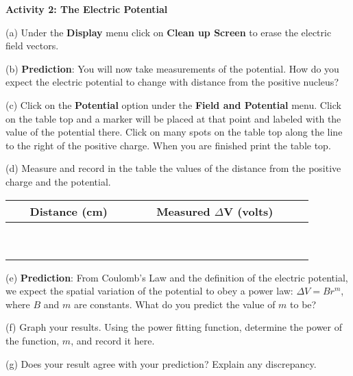 \textbf{Activity 2: The Electric Potential}

(a) Under the {\bf Display} menu click on {\bf Clean up Screen} to erase the
electric field vectors.

(b) \textbf{Prediction}: You will now take measurements of the potential.
How do you expect the electric potential to change with distance from the positive nucleus?
\vspace{15mm}
 
(c) Click on the \textbf{Potential} option under the \textbf{Field and Potential}
menu. Click on the table top and a marker will be
placed at that point and labeled with the value of the potential there.
Click on many spots on the table top along the line to the right of the
positive charge.
When you are finished print the table top.
\vspace{15mm}

(d) Measure and record in the table the values of the distance from the
positive charge and the potential.

\vspace{0.3cm}
{\centering \begin{tabular}{|c|c|c|}
\hline 
~~~Distance (cm)~~~&
~~~Measured \( \Delta  \)V (volts)~~~\\
\hline
\hline 
&
\\
\hline 
&
\\
\hline 
&
\\
\hline 
&
\\
\hline 
&
\\
\hline 
&
\\
\hline 
&
\\
\hline 
&
\\
\hline 
&
\\
\hline
\end{tabular}\par}
\vspace{0.3cm}


(e) \textbf{Prediction}: From Coulomb's Law and the definition of the
electric potential, we expect the spatial variation of the potential
to obey a power law: \( \Delta V=Br^{m} \), where \( B \)
and \( m \) are constants. What do you predict the value of \textbf{\( m \)}
to be?\vspace{15mm}


(f) Graph your results. Using the power fitting
function, determine the power of the function, $m$, and record it here.
\vspace{15mm}

(g) Does your result agree with your prediction? Explain any discrepancy.\vspace{15mm}


